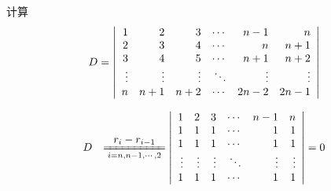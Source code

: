 \begin{frame}
  
    \begin{li}[2006－2007第二学期]
      计算
      $$
      D=\left|
      \begin{array}{rrrrrr}
        1&2&3&\cdots&n-1&n\\
        2&3&4&\cdots&n&n+1\\
        3&4&5&\cdots&n+1&n+2\\
        \vdots&\vdots&\vdots&\ddots&\vdots&\vdots\\
        n&n+1&n+2&\cdots&2n-2&2n-1
      \end{array}
      \right|
      $$
    \end{li}
    \pause

    \begin{jie}
    $$
    \begin{array}{rl}
      D&\xlongequal[i=n,n-1,\cd,2]{\ds r_{i}-r_{i-1}}\left|
      \begin{array}{rrrrrr}
        1&2&3&\cd&n-1&n\\
        1&1&1&\cd&1&1\\
        1&1&1&\cd&1&1\\
        \vd&\vd&\vd&\dd&\vd&\vd\\
        1&1&1&\cd&1&1
      \end{array}
      \right|=0
    \end{array}
    $$
    \end{jie}
    
\end{frame}


